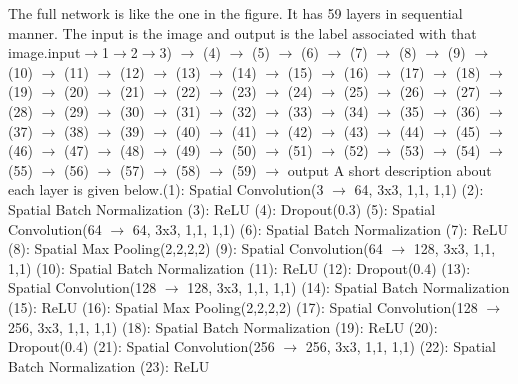 The full network is like the one in the figure. It has 59 layers in sequential manner. The input is the image and output is the label associated with that image.\hfill\break input\(\rightarrow\)1\(\rightarrow\)2\(\rightarrow\)3) \(\rightarrow\) (4) \(\rightarrow\) (5) \(\rightarrow\) (6) \(\rightarrow\) (7) \(\rightarrow\) (8) \(\rightarrow\) (9) \(\rightarrow\) (10) \(\rightarrow\) (11) \(\rightarrow\) (12) \(\rightarrow\) (13) \(\rightarrow\) (14) \(\rightarrow\) (15) \(\rightarrow\) (16) \(\rightarrow\) (17) \(\rightarrow\) (18) \(\rightarrow\) (19) \(\rightarrow\) (20) \(\rightarrow\) (21) \(\rightarrow\) (22) \(\rightarrow\) (23) \(\rightarrow\) (24) \(\rightarrow\) (25) \(\rightarrow\) (26) \(\rightarrow\) (27) \(\rightarrow\) (28) \(\rightarrow\) (29) \(\rightarrow\) (30) \(\rightarrow\) (31) \(\rightarrow\) (32) \(\rightarrow\) (33) \(\rightarrow\) (34) \(\rightarrow\) (35) \(\rightarrow\) (36) \(\rightarrow\) (37) \(\rightarrow\) (38) \(\rightarrow\) (39) \(\rightarrow\) (40) \(\rightarrow\) (41) \(\rightarrow\) (42) \(\rightarrow\) (43) \(\rightarrow\) (44) \(\rightarrow\) (45) \(\rightarrow\) (46) \(\rightarrow\) (47) \(\rightarrow\) (48) \(\rightarrow\) (49) \(\rightarrow\) (50) \(\rightarrow\) (51) \(\rightarrow\) (52) \(\rightarrow\) (53) \(\rightarrow\) (54) \(\rightarrow\) (55) \(\rightarrow\) (56) \(\rightarrow\) (57) \(\rightarrow\) (58) \(\rightarrow\) (59) \(\rightarrow\) output
\hfill\break
A short description about each layer is given below.\hfill\break (1): Spatial Convolution(3 \(\rightarrow\) 64, 3x3, 1,1, 1,1) \hfill\break
  (2): Spatial Batch Normalization \hfill\break
  (3): ReLU \hfill\break
  (4): Dropout(0.3) \hfill\break
  (5): Spatial Convolution(64 \(\rightarrow\) 64, 3x3, 1,1, 1,1) \hfill\break
  (6): Spatial Batch Normalization \hfill\break
  (7): ReLU \hfill\break
  (8): Spatial Max Pooling(2,2,2,2) \hfill\break
  (9): Spatial Convolution(64 \(\rightarrow\) 128, 3x3, 1,1, 1,1) \hfill\break
  (10): Spatial Batch Normalization \hfill\break
  (11): ReLU \hfill\break
  (12): Dropout(0.4) \hfill\break
  (13): Spatial Convolution(128 \(\rightarrow\) 128, 3x3, 1,1, 1,1) \hfill\break
  (14): Spatial Batch Normalization \hfill\break
  (15): ReLU \hfill\break
  (16): Spatial Max Pooling(2,2,2,2) \hfill\break
  (17): Spatial Convolution(128 \(\rightarrow\) 256, 3x3, 1,1, 1,1) \hfill\break
  (18): Spatial Batch Normalization \hfill\break
  (19): ReLU \hfill\break
  (20): Dropout(0.4) \hfill\break
  (21): Spatial Convolution(256 \(\rightarrow\) 256, 3x3, 1,1, 1,1) \hfill\break
  (22): Spatial Batch Normalization \hfill\break
  (23): ReLU \hfill\break
